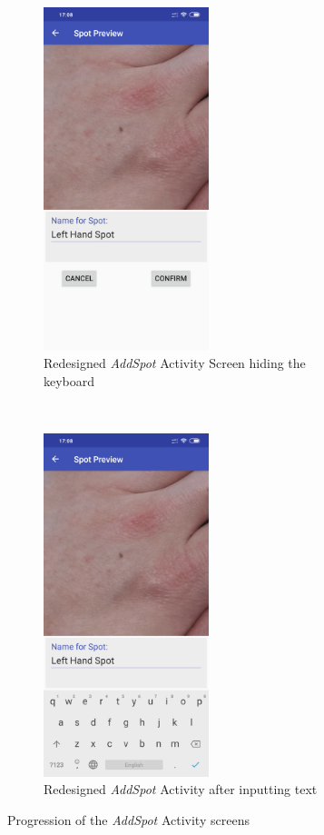 \begin{figure}[t!]
    ~
    \begin{subfigure}[t]{0.5\textwidth}
        \centering
        \includegraphics[height=10cm]{figures/confirmadd1.png}
        \caption{Redesigned \emph{AddSpot} Activity Screen hiding the keyboard}
        \label{subfig:newaddspotkeyboard}
    \end{subfigure}%
     ~
    \begin{subfigure}[t]{0.5\textwidth}
        \centering
        \includegraphics[height=10cm]{figures/addspot2.png}
        \caption{Redesigned \emph{AddSpot} Activity after inputting text}
        \label{subfig:newaddspotnokeyboard}
    \end{subfigure}
    \caption{Progression of the \emph{AddSpot} Activity screens}
\end{figure}

